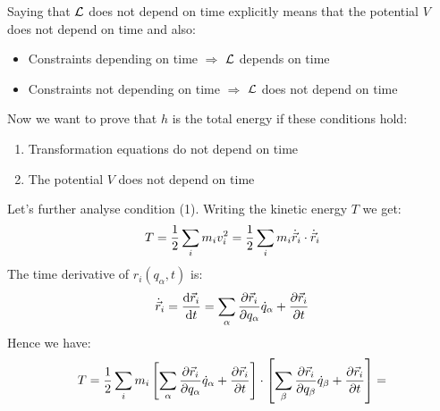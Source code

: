 Saying that $\mathcal{L}$ does not depend on time explicitly means that the potential $V$ does not depend on time and also:
\begin{itemize}
    \item Constraints depending on time $\Rightarrow$ $\mathcal{L}$ depends on time
    \item Constraints not depending on time $\Rightarrow$ $\mathcal{L}$ does not depend on time
\end{itemize}
Now we want to prove that $h$ is the total energy if these conditions hold:
\begin{enumerate}
    \item Transformation equations do not depend on time
    \item The potential $V$ does not depend on time
\end{enumerate}
Let's further analyse condition (1). Writing the kinetic energy $T$ we get:
\begin{equation}
    T = \dfrac{1}{2}\displaystyle\sum_i m_i v_i^2 = \dfrac{1}{2}\displaystyle\sum_i m_i \dot{\vec{r}}_i \cdot \dot{\vec{r}}_i
\end{equation}
The time derivative of $r_i(q_{\alpha},t)$ is:
\begin{equation}
    \dot{\vec{r}}_i = \dfrac{\dd{\vec{r}_i}}{\dd{t}} = \displaystyle\sum_{\alpha}\dfrac{\partial \vec{r}_i}{\partial q_{\alpha}}\dot{q}_{\alpha} + \dfrac{\partial \vec{r}_i}{\partial t}
\end{equation}
Hence we have:
\begin{equation}
    T = \dfrac{1}{2}\displaystyle\sum_i m_i \left[\displaystyle\sum_{\alpha}\dfrac{\partial \vec{r}_i}{\partial q_{\alpha}}\dot{q}_{\alpha} + \dfrac{\partial \vec{r}_i}{\partial t}\right] \cdot \left[\displaystyle\sum_{\beta}\dfrac{\partial \vec{r}_i}{\partial q_{\beta}}\dot{q}_{\beta} + \dfrac{\partial \vec{r}_i}{\partial t}\right] =
\end{equation}


